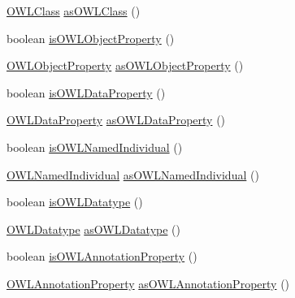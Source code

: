\begin{DoxyCompactItemize}
\item 
\hyperlink{interfaceorg_1_1semanticweb_1_1owlapi_1_1model_1_1_o_w_l_class}{O\-W\-L\-Class} \hyperlink{interfaceorg_1_1semanticweb_1_1owlapi_1_1model_1_1_o_w_l_entity_a3df61dbe28e1744da2f52577f887e41c}{as\-O\-W\-L\-Class} ()
\item 
boolean \hyperlink{interfaceorg_1_1semanticweb_1_1owlapi_1_1model_1_1_o_w_l_entity_aa7566ad68fb1091b318f3d7eb40ccc64}{is\-O\-W\-L\-Object\-Property} ()
\item 
\hyperlink{interfaceorg_1_1semanticweb_1_1owlapi_1_1model_1_1_o_w_l_object_property}{O\-W\-L\-Object\-Property} \hyperlink{interfaceorg_1_1semanticweb_1_1owlapi_1_1model_1_1_o_w_l_entity_a6a61cbaff854f9773c607f49c90a2be1}{as\-O\-W\-L\-Object\-Property} ()
\item 
boolean \hyperlink{interfaceorg_1_1semanticweb_1_1owlapi_1_1model_1_1_o_w_l_entity_a9bc2ef35b43e65021ef0e374803914c5}{is\-O\-W\-L\-Data\-Property} ()
\item 
\hyperlink{interfaceorg_1_1semanticweb_1_1owlapi_1_1model_1_1_o_w_l_data_property}{O\-W\-L\-Data\-Property} \hyperlink{interfaceorg_1_1semanticweb_1_1owlapi_1_1model_1_1_o_w_l_entity_aa8b175d8e608075da430734d12549103}{as\-O\-W\-L\-Data\-Property} ()
\item 
boolean \hyperlink{interfaceorg_1_1semanticweb_1_1owlapi_1_1model_1_1_o_w_l_entity_afb337831033f45ccf5f4c89d912047d5}{is\-O\-W\-L\-Named\-Individual} ()
\item 
\hyperlink{interfaceorg_1_1semanticweb_1_1owlapi_1_1model_1_1_o_w_l_named_individual}{O\-W\-L\-Named\-Individual} \hyperlink{interfaceorg_1_1semanticweb_1_1owlapi_1_1model_1_1_o_w_l_entity_a74cbf6f80eec3a29400b91d73b0f473e}{as\-O\-W\-L\-Named\-Individual} ()
\item 
boolean \hyperlink{interfaceorg_1_1semanticweb_1_1owlapi_1_1model_1_1_o_w_l_entity_a83510eb59ba6fcd704953f6a1b898812}{is\-O\-W\-L\-Datatype} ()
\item 
\hyperlink{interfaceorg_1_1semanticweb_1_1owlapi_1_1model_1_1_o_w_l_datatype}{O\-W\-L\-Datatype} \hyperlink{interfaceorg_1_1semanticweb_1_1owlapi_1_1model_1_1_o_w_l_entity_ab6f720dff92504ecd3c5fd505821da12}{as\-O\-W\-L\-Datatype} ()
\item 
boolean \hyperlink{interfaceorg_1_1semanticweb_1_1owlapi_1_1model_1_1_o_w_l_entity_a137d444a3ca1844eeea5fbb9d484dd66}{is\-O\-W\-L\-Annotation\-Property} ()
\item 
\hyperlink{interfaceorg_1_1semanticweb_1_1owlapi_1_1model_1_1_o_w_l_annotation_property}{O\-W\-L\-Annotation\-Property} \hyperlink{interfaceorg_1_1semanticweb_1_1owlapi_1_1model_1_1_o_w_l_entity_a6a7f121ea8d5999b99d62bba84fee153}{as\-O\-W\-L\-Annotation\-Property} ()

\end{DoxyCompactItemize}
